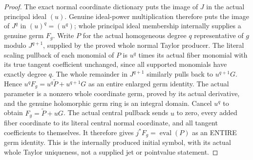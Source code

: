 \begin{proof}
The exact normal coordinate dictionary puts the image of $J$ in the actual
principal ideal $(u)$. Genuine ideal-power multiplication therefore puts
the image of $J^q$ in $(u)^q=(u^q)$; whole principal ideal membership
internally supplies a genuine germ $F_g$. Write $P$ for the actual
homogeneous degree $q$ representative of $g$ modulo $J^{q+1}$, supplied by
the proved whole normal Taylor producer. The literal scaling pullback of
each monomial of $P$ is $u^q$ times its actual fiber monomial with its true
tangent coefficient unchanged, since all supported monomials have exactly
degree $q$. The whole remainder in $J^{q+1}$ similarly pulls back to
$u^{q+1}G$. Hence
$u^qF_g=u^q\widetilde P+u^{q+1}G$ as an entire enlarged germ identity.
The actual parameter is a nonzero whole coordinate germ, proved by its
actual derivative, and the genuine holomorphic germ ring is an integral
domain. Cancel $u^q$ to obtain $F_g=\widetilde P+uG$. The actual central
pullback sends $u$ to zero, every added fiber coordinate to its literal
central normal coordinate, and all tangent coefficients to themselves.
It therefore gives $j^*F_g=\operatorname{eval}(P)$ as an ENTIRE germ
identity. This is the internally produced initial symbol, with its actual
whole Taylor uniqueness, not a supplied jet or pointvalue statement.
\end{proof}

